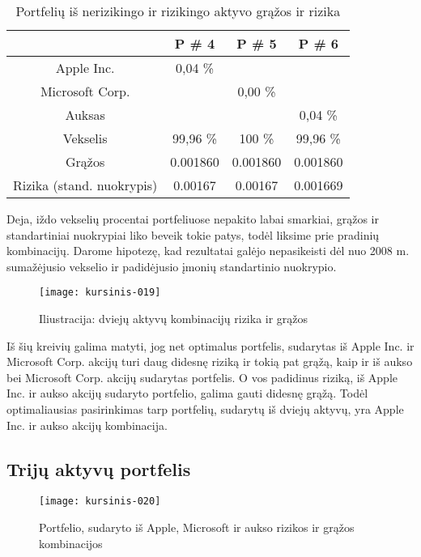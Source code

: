 \documentclass[12pt, a14paper, lithuanian]{article}
\begin{document}
\begin{table}[ht]
\begin{center}
\begin{tabular}{cccc}
  \hline
 & P \# 4 & P \# 5 & P \# 6 \\ 
  \hline
Apple Inc. & 0,04 \% &  &  &  \\
\hline
 Microsoft Corp. &  & 0,00 \% &  &  \\ 
   \hline
   Auksas & & & 0,04 \% &\\
   \hline
   Vekselis & 99,96 \% & 100 \% & 99,96 \% &\\
   \hline
   Grąžos & 0.001860 & 0.001860 & 0.001860 & \\
   \hline
   Rizika (stand. nuokrypis) & 0.00167 & 0.00167 & 0.001669 & \\
   \hline
\end{tabular}
\end{center}
\caption{Portfelių iš nerizikingo ir rizikingo aktyvo grąžos ir rizika}
\end{table}

Deja, iždo vekselių procentai portfeliuose nepakito labai smarkiai, grąžos ir standartiniai nuokrypiai liko beveik tokie patys, todėl liksime prie pradinių kombinacijų. Darome hipotezę, kad  rezultatai galėjo nepasikeisti dėl nuo 2008 m. sumažėjusio vekselio ir padidėjusio įmonių standartinio nuokrypio.




\begin{figure}[H]
  \centering
\texttt{[image: kursinis-019]}
  \caption{Iliustracija: dviejų aktyvų kombinacijų rizika ir grąžos}
\end{figure}  

Iš šių kreivių galima matyti, jog net optimalus portfelis, sudarytas iš Apple Inc. ir Microsoft Corp. akcijų turi daug
didesnę riziką ir tokią pat grąžą, kaip ir iš aukso bei Microsoft Corp. akcijų sudarytas portfelis. O vos padidinus riziką,
iš Apple Inc. ir aukso akcijų sudaryto portfelio, galima gauti didesnę grąžą. Todėl optimaliausias pasirinkimas
tarp portfelių, sudarytų iš dviejų aktyvų, yra Apple Inc. ir aukso akcijų kombinacija.

           
\subsection{Trijų aktyvų portfelis}
 
\begin{figure}[H]
  \centering
\texttt{[image: kursinis-020]}
  \caption{Portfelio, sudaryto iš Apple, Microsoft ir aukso rizikos ir grąžos kombinacijos}
\end{figure}
\end{document}
